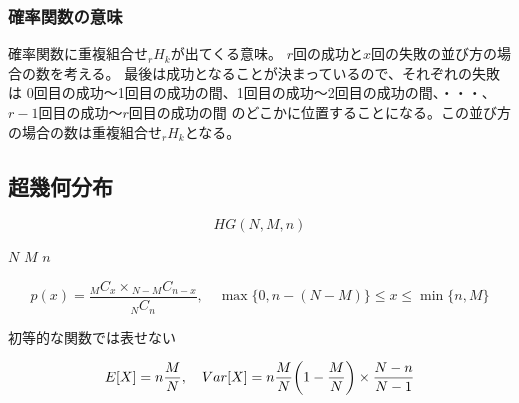 \subsubsection{確率関数の意味}
確率関数に重複組合せ\({}_{r} H_{k}\)が出てくる意味。  
\(r\)回の成功と\(x\)回の失敗の並び方の場合の数を考える。
最後は成功となることが決まっているので、それぞれの失敗は
0回目の成功～1回目の成功の間、1回目の成功～2回目の成功の間、・・・、\(r-1\)回目の成功～\(r\)回目の成功の間
のどこかに位置することになる。この並び方の場合の数は重複組合せ\({}_{r} H_{k}\)となる。

\subsection{超幾何分布}

\begin{outline}[description]
  \1 [表記]
  \begin{equation}
    HG(N, M, n)
  \end{equation}
  
  \1 [パラメータ]
  \2
  \2 [くじの総数] \(N\)
  \2 [あたりの数] \(M\)
  \2 [くじを引く回数] \(n\)
  
  \1 [確率関数]
  \begin{equation}
    p (x) = \frac{{}_M C_{x} \times {}_{N-M} C_{n-x}}{{}_{N} C_{n}} , \quad 
    \max \{0, n - (N - M)\} \leq x \leq \min \{n, M\}
  \end{equation}
  
  \1 [確率母関数] 初等的な関数では表せない
  
  \1 [期待値・分散]
  \begin{equation}
    E \qty [X] = n \frac{M}{N}, \quad 
    Var \qty [ X ] = n \frac{M}{N} \qty (1 - \frac{M}{N}) \times \frac{N - n}{N - 1}
  \end{equation}
\end{outline}

